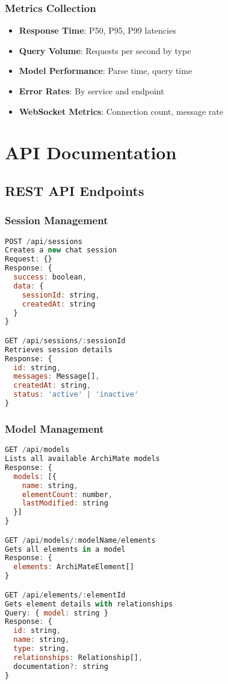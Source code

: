 \documentclass[12pt,a4paper]{report}
\begin{document}
\subsection{Metrics Collection}

\begin{itemize}
    \item \textbf{Response Time}: P50, P95, P99 latencies
    \item \textbf{Query Volume}: Requests per second by type
    \item \textbf{Model Performance}: Parse time, query time
    \item \textbf{Error Rates}: By service and endpoint
    \item \textbf{WebSocket Metrics}: Connection count, message rate
\end{itemize}

\chapter{API Documentation}

\section{REST API Endpoints}

\subsection{Session Management}

\begin{lstlisting}[language=JavaScript, caption=Session API]
POST /api/sessions
Creates a new chat session
Request: {}
Response: {
  success: boolean,
  data: {
    sessionId: string,
    createdAt: string
  }
}

GET /api/sessions/:sessionId
Retrieves session details
Response: {
  id: string,
  messages: Message[],
  createdAt: string,
  status: 'active' | 'inactive'
}
\end{lstlisting}

\subsection{Model Management}

\begin{lstlisting}[language=JavaScript, caption=Model API]
GET /api/models
Lists all available ArchiMate models
Response: {
  models: [{
    name: string,
    elementCount: number,
    lastModified: string
  }]
}

GET /api/models/:modelName/elements
Gets all elements in a model
Response: {
  elements: ArchiMateElement[]
}

GET /api/elements/:elementId
Gets element details with relationships
Query: { model: string }
Response: {
  id: string,
  name: string,
  type: string,
  relationships: Relationship[],
  documentation?: string
}
\end{lstlisting}
\end{document}
